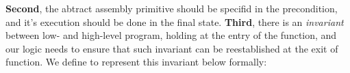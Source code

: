 \textbf{Second}, the abtract assembly primitive should be 
specifid in the precondition, and it's execution 
should be done in the final state. 
\textbf{Third}, there is an {\it invariant}   
between low- and high-level program, holding at the entry of 
the function, and our logic needs to ensure that such invariant 
can be reestablished at the exit of function.  
% 
We define \INV{} to represent this invariant below formally: 
